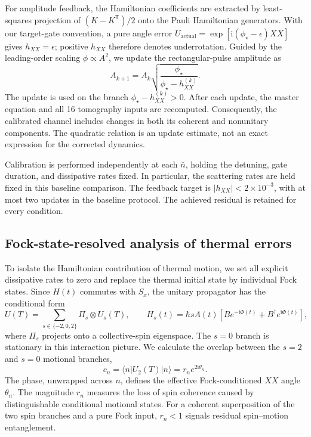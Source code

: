 \documentclass[a4paper,11pt]{article}
\newcommand{\ii}{\mathrm{i}}
\newcommand{\ket}[1]{\lvert #1\rangle}
\newcommand{\bra}[1]{\langle #1\rvert}
\begin{document}
For amplitude feedback, the Hamiltonian coefficients are extracted by
least-squares projection of $(K-K^{\mathsf T})/2$ onto the Pauli
Hamiltonian generators. With our target-gate convention, a pure angle
error $U_{\mathrm{actual}}=\exp[\ii(\phi_\star-\epsilon)XX]$
gives $h_{XX}=\epsilon$; positive $h_{XX}$ therefore denotes
underrotation. Guided by the leading-order scaling
$\phi\propto A^2$, we update the rectangular-pulse amplitude as
\begin{equation}
 A_{k+1}=A_k
 \sqrt{\frac{\phi_\star}{\phi_\star-h_{XX}^{(k)}}}.
 \label{eq:methods_calibration}
\end{equation}
The update is used on the branch $\phi_\star-h_{XX}^{(k)}>0$.
After each update, the master equation and all 16 tomography inputs are
recomputed. Consequently, the calibrated channel includes changes in
both its coherent and nonunitary components. The quadratic relation is
an update estimate, not an exact expression for the corrected dynamics.

Calibration is performed independently at each $\bar n$, holding the
detuning, gate duration, and dissipative rates fixed. In particular, the
scattering rates are held fixed in this baseline comparison. The feedback
target is $|h_{XX}|<2\times10^{-3}$, with at most two updates in the
baseline protocol. The achieved residual is retained for every condition.

\subsection{Fock-state-resolved analysis of thermal errors}
\label{subsec:fock_analysis}

To isolate the Hamiltonian contribution of thermal motion, we set all
explicit dissipative rates to zero and replace the thermal initial state
by individual Fock states. Since $H(t)$ commutes with $S_x$, the unitary
propagator has the conditional form
\begin{equation}
 U(T)=\sum_{s\in\{-2,0,2\}}\Pi_s\otimes U_s(T),
 \qquad
 H_s(t)=\hbar sA(t)
   \left[B e^{-\ii\Phi(t)}+B^\dagger e^{\ii\Phi(t)}\right],
\end{equation}
where $\Pi_s$ projects onto a collective-spin eigenspace.
The $s=0$ branch is stationary in this interaction picture. We calculate
the overlap between the $s=2$ and $s=0$ motional branches,
\begin{equation}
 c_n=\bra n U_2(T)\ket n=r_n e^{2\ii\theta_n}.
 \label{eq:methods_fock_coherence}
\end{equation}
The phase, unwrapped across $n$, defines the effective Fock-conditioned
$XX$ angle $\theta_n$. The magnitude $r_n$ measures the loss of spin
coherence caused by distinguishable conditional motional states. For a
coherent superposition of the two spin branches and a pure Fock input,
$r_n<1$ signals residual spin--motion entanglement.
\end{document}
